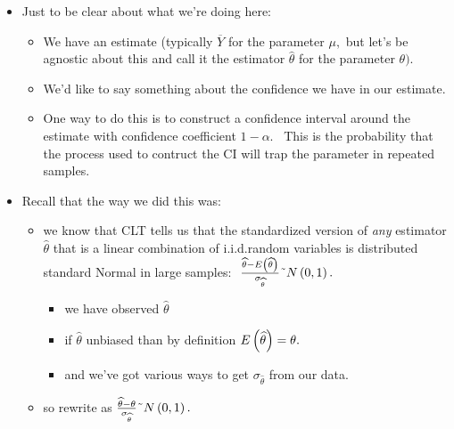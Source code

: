 \documentclass[11pt]{article}
\begin{document}
\begin{itemize}
\item Just to be clear about what we're doing here:

\begin{itemize}
\item We have an estimate (typically $\overline{Y}$ for the parameter $\mu ,$
but let's be agnostic about this and call it the estimator $\widehat{\theta }
$ for the parameter $\theta ).$

\item We'd like to say something about the confidence we have in our
estimate.

\item One way to do this is to construct a confidence interval around the
estimate with confidence coefficient $1-\alpha .$ \ This is the probability
that the process used to contruct the CI will trap the parameter in repeated
samples.
\end{itemize}

\item Recall that the way we did this was:

\begin{itemize}
\item we know that CLT tells us that the standardized version of \textit{any 
}estimator $\widehat{\theta }$ that is a linear combination of i.i.d.random
variables is distributed standard Normal in large samples:  $\ \frac{%
\widehat{\theta }-E\left( \widehat{\theta }\right) }{\sigma _{\widehat{%
\theta }}}\symbol{126}N\left( 0,1\right) .$

\begin{itemize}
\item we have observed $\widehat{\theta }$

\item if $\widehat{\theta }$ unbiased than by definition $E\left( \widehat{%
\theta }\right) =\theta .$

\item and we've got various ways to get $\sigma _{\widehat{\theta }}$ from
our data.
\end{itemize}

\item so rewrite as $\frac{\widehat{\theta }-\theta }{\sigma _{\widehat{%
\theta }}}\symbol{126}N\left( 0,1\right) .$


\end{itemize}
\end{itemize}
\end{document}
